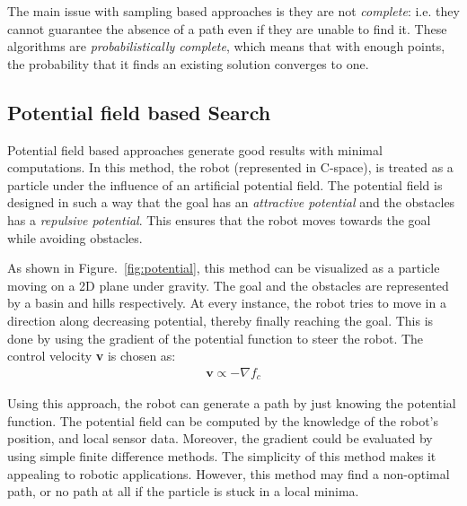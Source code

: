 The main issue with sampling based approaches is they are not \textit{complete}: i.e. they cannot guarantee the absence of a path even if they are unable to find it. These algorithms are \textit{probabilistically complete}, which means that with enough points, the probability that it finds an existing solution converges to one.
\subsection{Potential field based Search}
\label{sec:pot_search}
Potential field based approaches generate good results with minimal computations. In this method, the robot (represented in C-space), is treated as a particle under the influence of an artificial potential field. The potential field is designed in such a way that the goal has an \textit{attractive potential} and the obstacles has a \textit{repulsive potential}. This ensures that the robot moves towards the goal while avoiding obstacles. 

As shown in Figure.~\ref{fig:potential}, this method can be visualized as a particle moving on a 2D plane under gravity. The goal and the obstacles are represented by a basin and hills respectively. At every instance, the robot tries to move in a direction along decreasing potential, thereby finally reaching the goal. This is done by using the gradient of the potential function to steer the robot. The control velocity \textbf{v} is chosen as:
\begin{align}
\textbf{v} \propto -\nabla f_c
\end{align}

Using this approach, the robot can generate a path by just knowing the potential function. The potential field can be computed by the knowledge of the robot's position, and local sensor data. Moreover, the gradient could be evaluated by using simple finite difference methods. The simplicity of this method makes it appealing to robotic applications. However, this method may find a non-optimal path, or no path at all if the particle is stuck in a local minima.


